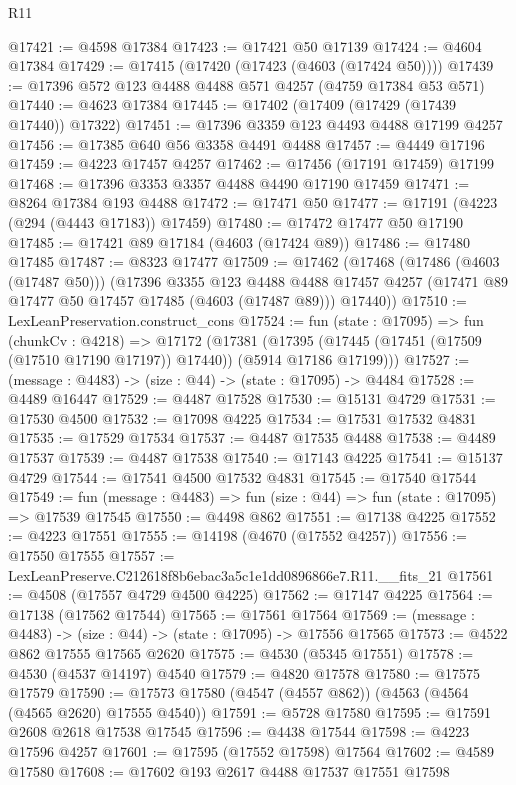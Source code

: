 \begin{lexlean}{R11}
\begin{coremodule}
@17421 := @4598 @17384
@17423 := @17421 @50 @17139
@17424 := @4604 @17384
@17429 := @17415 (@17420 (@17423 (@4603 (@17424 @50))))
@17439 := @17396 @572 @123 @4488 @4488 @571 @4257 (@4759 @17384 @53 @571)
@17440 := @4623 @17384
@17445 := @17402 (@17409 (@17429 (@17439 @17440)) @17322)
@17451 := @17396 @3359 @123 @4493 @4488 @17199 @4257
@17456 := @17385 @640 @56 @3358 @4491 @4488
@17457 := @4449 @17196
@17459 := @4223 @17457 @4257
@17462 := @17456 (@17191 @17459) @17199
@17468 := @17396 @3353 @3357 @4488 @4490 @17190 @17459
@17471 := @8264 @17384 @193 @4488
@17472 := @17471 @50
@17477 := @17191 (@4223 (@294 (@4443 @17183)) @17459)
@17480 := @17472 @17477 @50 @17190
@17485 := @17421 @89 @17184 (@4603 (@17424 @89))
@17486 := @17480 @17485
@17487 := @8323 @17477
@17509 := @17462
    (@17468
      (@17486 (@4603 (@17487 @50)))
      (@17396
        @3355
        @123
        @4488
        @4488
        @17457
        @4257
        (@17471 @89 @17477 @50 @17457 @17485 (@4603 (@17487 @89)))
        @17440))
@17510 := LexLeanPreservation.construct_cons
@17524 := fun (state : @17095) =>
  fun (chunkCv : @4218) =>
  @17172
    (@17381 (@17395 (@17445 (@17451 (@17509 (@17510 @17190 @17197)) @17440)) (@5914 @17186 @17199)))
@17527 := (message : @4483) -> (size : @44) -> (state : @17095) -> @4484
@17528 := @4489 @16447
@17529 := @4487 @17528
@17530 := @15131 @4729
@17531 := @17530 @4500
@17532 := @17098 @4225
@17534 := @17531 @17532 @4831
@17535 := @17529 @17534
@17537 := @4487 @17535 @4488
@17538 := @4489 @17537
@17539 := @4487 @17538
@17540 := @17143 @4225
@17541 := @15137 @4729
@17544 := @17541 @4500 @17532 @4831
@17545 := @17540 @17544
@17549 := fun (message : @4483) => fun (size : @44) => fun (state : @17095) => @17539 @17545
@17550 := @4498 @862
@17551 := @17138 @4225
@17552 := @4223 @17551
@17555 := @14198 (@4670 (@17552 @4257))
@17556 := @17550 @17555
@17557 := LexLeanPreserve.C212618f8b6ebac3a5c1e1dd0896866e7.R11.__fits_21
@17561 := @4508 (@17557 @4729 @4500 @4225)
@17562 := @17147 @4225
@17564 := @17138 (@17562 @17544)
@17565 := @17561 @17564
@17569 := (message : @4483) -> (size : @44) -> (state : @17095) -> @17556 @17565
@17573 := @4522 @862 @17555 @17565 @2620
@17575 := @4530 (@5345 @17551)
@17578 := @4530 (@4537 @14197) @4540
@17579 := @4820 @17578
@17580 := @17575 @17579
@17590 := @17573 @17580 (@4547 (@4557 @862)) (@4563 (@4564 (@4565 @2620) @17555 @4540))
@17591 := @5728 @17580
@17595 := @17591 @2608 @2618 @17538 @17545
@17596 := @4438 @17544
@17598 := @4223 @17596 @4257
@17601 := @17595 (@17552 @17598) @17564
@17602 := @4589 @17580
@17608 := @17602 @193 @2617 @4488 @17537 @17551 @17598

\end{coremodule}
\end{lexlean}
